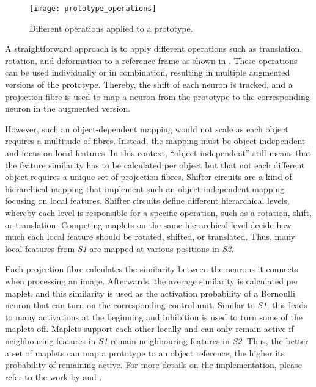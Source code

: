 \begin{figure}[h]
    \centering
    \texttt{[image: prototype\_operations]}
    \caption[Operations applied to a prototype]{Different operations applied to a prototype.}
\end{figure}
A straightforward approach is to apply different operations such as translation, rotation, and deformation to a reference frame as shown in . These operations can be used individually or in combination, resulting in multiple augmented versions of the prototype.
Thereby, the shift of each neuron is tracked, and a projection fibre is used to map a neuron from the prototype to the corresponding neuron in the augmented version.

However, such an object-dependent mapping would not scale as each object requires a multitude of fibres.
Instead, the mapping must be object-independent and focus on local features.
In this context, ``object-independent'' still means that the feature similarity has to be calculated per object but that not each different object requires a unique set of projection fibres.
Shifter circuits  are a kind of hierarchical mapping that implement such an object-independent mapping focusing on local features.
Shifter circuits define different hierarchical levels, whereby each level is responsible for a specific operation, such as a rotation, shift, or translation. 
Competing maplets on the same hierarchical level decide how much each local feature should be rotated, shifted, or translated.
Thus, many local features from \emph{S1} are mapped at various positions in \emph{S2}.

Each projection fibre calculates the similarity between the neurons it connects when processing an image.
Afterwards, the average similarity is calculated per maplet, and this similarity is used as the activation probability of a Bernoulli neuron that can turn on the corresponding control unit.
Similar to \emph{S1}, this leads to many activations at the beginning and inhibition is used to turn some of the maplets off.
Maplets support each other locally and can only remain active if neighbouring features in \emph{S1} remain neighbouring features in \emph{S2}.
Thus, the better a set of maplets can map a prototype to an object reference, the higher its probability of remaining active.
For more details on the implementation, please refer to the work by  and .



